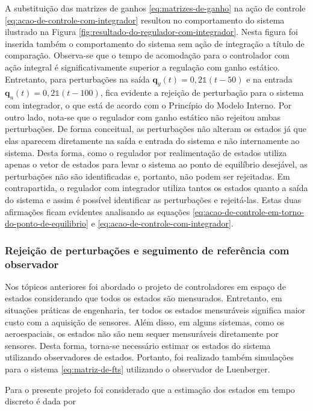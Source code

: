 A substituição das matrizes de ganhos \ref{eq:matrizes-de-ganho} na ação de
controle \ref{eq:acao-de-controle-com-integrador} resultou no comportamento do
sistema ilustrado na Figura \ref{fig:resultado-do-regulador-com-integrador}.
Nesta figura foi inserida também o comportamento do sistema sem ação de
integração a título de comparação. Observa-se que o tempo de acomodação para o
controlador com ação integral é significativamente superior a regulação com
ganho estático. Entretanto, para perturbações na saída $\mathbf{q}_{y}(t) =
0,2\mathbf{\mathds{1}}(t-50)$ e na entrada $\mathbf{q}_{u}(t) =
0,2\mathbf{\mathds{1}}(t-100)$, fica evidente a rejeição de perturbação para o
sistema com integrador, o que está de acordo com o Princípio do Modelo Interno.
Por outro lado, nota-se que o regulador com ganho estático não rejeitou ambas
perturbações. De forma conceitual, as perturbações não alteram os estados já que
elas aparecem diretamente na saída e entrada do sistema e não internamente ao
sistema. Desta forma, como o regulador por realimentação de estados utiliza
apenas o vetor de estados para levar o sistema ao ponto de equilíbrio desejável,
as perturbações não são identificadas e, portanto, não podem ser rejeitadas. Em
contrapartida, o regulador com integrador utiliza tantos os estados quanto a
saída do sistema e assim é possível identificar as perturbações e rejeitá-las.
Estas duas afirmações ficam evidentes analisando as equações
\ref{eq:acao-de-controle-em-torno-do-ponto-de-equilibrio} e
\ref{eq:acao-de-controle-com-integrador}.

\subsubsection{Rejeição de perturbações e seguimento de referência com observador}
\label{subsub:controlador-utilizando-observador-de-estados}

Nos tópicos anteriores foi abordado o projeto de controladores em espaço de
estados considerando que todos os estados são mensurados. Entretanto, em
situações práticas de engenharia, ter todos os estados mensuráveis significa
maior custo com a aquisição de sensores. Além disso, em alguns sistemas, como os
aeroespaciais, os estados não são nem sequer mensuráveis diretamente por
sensores. Desta forma, torna-se necessário estimar os estados do sistema
utilizando observadores de estados. Portanto, foi realizado também simulações
para o sistema \ref{eq:matriz-de-fts} utilizando o observador de Luenberger.

Para o presente projeto foi considerado que a estimação dos estados em tempo
discreto é dada por

